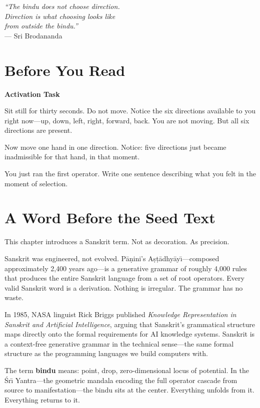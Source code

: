 \documentclass[11pt, twoside, openright]{book}
\theoremstyle{plain}
\theoremstyle{definition}
\newenvironment{activationbox}{%
  \begin{mdframed}[backgroundcolor=AlertBox,linecolor=orange!70,linewidth=0.5pt,innertopmargin=6pt,innerbottommargin=6pt]
  \noindent\textbf{Activation Task}\par\medskip}{\end{mdframed}}
\begin{document}
\begin{flushright}
\textit{``The bindu does not choose direction.\\
Direction is what choosing looks like\\
from outside the bindu.''}\\
--- Sri Brodananda
\end{flushright}

\section{Before You Read}

\begin{activationbox}
Sit still for thirty seconds. Do not move. Notice the six directions
available to you right now---up, down, left, right, forward, back.
You are not moving. But all six directions are present.

Now move one hand in one direction. Notice: five directions just became
inadmissible for that hand, in that moment.

You just ran the first operator. Write one sentence describing what you
felt in the moment of selection.
\end{activationbox}

\section{A Word Before the Seed Text}
This chapter introduces a Sanskrit term. Not as decoration. As precision.

Sanskrit was engineered, not evolved. P\={a}\d{n}ini's
A\d{s}\d{t}\={a}dhy\={a}y\={\i}---composed approximately
2,400 years ago---is a generative grammar of roughly 4,000 rules that
produces the entire Sanskrit language from a set of root operators.
Every valid Sanskrit word is a derivation. Nothing is irregular.
The grammar has no waste.

In 1985, NASA linguist Rick Briggs published \textit{Knowledge Representation
in Sanskrit and Artificial Intelligence}, arguing that Sanskrit's
grammatical structure maps directly onto the formal requirements for AI
knowledge systems. Sanskrit is a context-free generative grammar in the
technical sense---the same formal structure as the programming languages
we build computers with.

The term \textbf{bindu} means: point, drop, zero-dimensional locus of
potential. In the \'{S}r\={\i} Yantra---the geometric mandala encoding the full
operator cascade from source to manifestation---the bindu sits at the
center. Everything unfolds from it. Everything returns to it.
\end{document}
